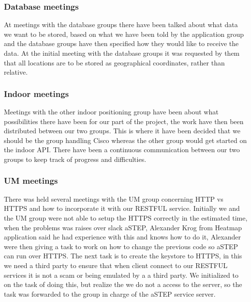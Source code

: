 \subsubsection*{Database meetings}
At meetings with the database groups there have been talked about what data we want to be stored, based on what we have been told by the application group and the database groups have then specified how they would like to receive the data. At the initial meeting with the database groups it was requested by them that all locations are to be stored as geographical coordinates, rather than relative.%

\subsubsection*{Indoor meetings}
Meetings with the other indoor positioning group have been about what possibilities there have been for our part of the project, the work have then been distributed between our two groups. This is where it have been decided that we should be the group handling Cisco whereas the other group would get started on the indoor API. There have been a continuous communication between our two groups to keep track of progress and difficulties. 

\subsubsection*{UM meetings}
There was held several meetings with the UM group concerning HTTP vs HTTPS and how to incorporate it with our RESTFUL service. Initially we and the UM group were not able to setup the HTTPS correctly in the estimated time, when the problems was raises over slack aSTEP, Alexander Krog from Heatmap application said he had experience with this and knows how to do it, Alexander were then giving a task to work on how to change the previous code so aSTEP can run over HTTPS. The next task is to create the keystore to HTTPS, in this we need a third party to ensure that when client connect to our RESTFUL services it is not a scam or being emulated by a a third party. We initialized to on the task of doing this, but realize the we do not a access to the server, so the task was forwarded to the group in charge of the aSTEP service server. 
